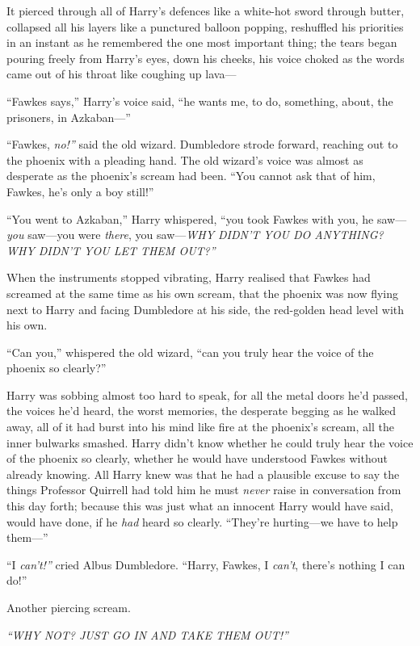 It pierced through all of Harry's defences like a white-hot sword
through butter, collapsed all his layers like a punctured balloon
popping, reshuffled his priorities in an instant as he remembered the
one most important thing; the tears began pouring freely from Harry's
eyes, down his cheeks, his voice choked as the words came out of his
throat like coughing up lava---

``Fawkes says,'' Harry's voice said, ``he wants me, to do, something,
about, the prisoners, in Azkaban---''

``Fawkes, \emph{no!''} said the old wizard. Dumbledore strode forward,
reaching out to the phoenix with a pleading hand. The old wizard's voice
was almost as desperate as the phoenix's scream had been. ``You cannot
ask that of him, Fawkes, he's only a boy still!''

``You went to Azkaban,'' Harry whispered, ``you took Fawkes with you, he
saw---\emph{you} saw---you were \emph{there}, you saw---\emph{WHY DIDN'T
YOU DO ANYTHING? WHY DIDN'T YOU LET THEM OUT?''}

When the instruments stopped vibrating, Harry realised that Fawkes had
screamed at the same time as his own scream, that the phoenix was now
flying next to Harry and facing Dumbledore at his side, the red-golden
head level with his own.

``Can you,'' whispered the old wizard, ``can you truly hear the voice of
the phoenix so clearly?''

Harry was sobbing almost too hard to speak, for all the metal doors he'd
passed, the voices he'd heard, the worst memories, the desperate begging
as he walked away, all of it had burst into his mind like fire at the
phoenix's scream, all the inner bulwarks smashed. Harry didn't know
whether he could truly hear the voice of the phoenix so clearly, whether
he would have understood Fawkes without already knowing. All Harry knew
was that he had a plausible excuse to say the things Professor Quirrell
had told him he must \emph{never} raise in conversation from this day
forth; because this was just what an innocent Harry would have said,
would have done, if he \emph{had} heard so clearly. ``They're
hurting---we have to help them---''

``I \emph{can't!''} cried Albus Dumbledore. ``Harry, Fawkes, I
\emph{can't}, there's nothing I can do!''

Another piercing scream.

\emph{``WHY NOT? JUST GO IN AND TAKE THEM OUT!''}

